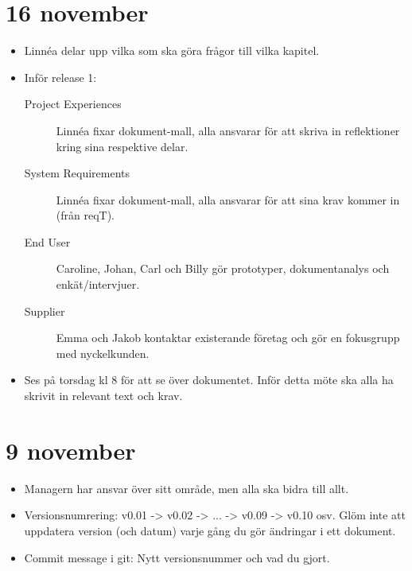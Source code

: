 \documentclass[10pt,a4paper]{article}
\author{Linnéa Claesson}
\begin{document}
\section*{16 november}
\begin{itemize}
\item Linnéa delar upp vilka som ska göra frågor till vilka kapitel.
\item Inför release 1:
\begin{description}
\item[Project Experiences] Linnéa fixar dokument-mall, alla ansvarar för att skriva in reflektioner kring sina respektive delar.
\item[System Requirements] Linnéa fixar dokument-mall, alla ansvarar för att sina krav kommer in (från reqT).
\item[End User] Caroline, Johan, Carl och Billy gör prototyper, dokumentanalys och enkät/intervjuer.
\item[Supplier] Emma och Jakob kontaktar existerande företag och gör en fokusgrupp med nyckelkunden.
\end{description}
\item Ses på torsdag kl 8 för att se över dokumentet. Inför detta möte ska alla ha skrivit in relevant text och krav.
\end{itemize}
\section*{9 november}
\begin{itemize}
\item Managern har ansvar över sitt område, men alla ska bidra till allt.
\item Versionsnumrering: v0.01 -> v0.02 -> ... -> v0.09 -> v0.10 osv. Glöm inte att uppdatera version (och datum) varje gång du gör ändringar i ett dokument.
\item Commit message i git: Nytt versionsnummer och vad du gjort.
\end{itemize}
\end{document}
